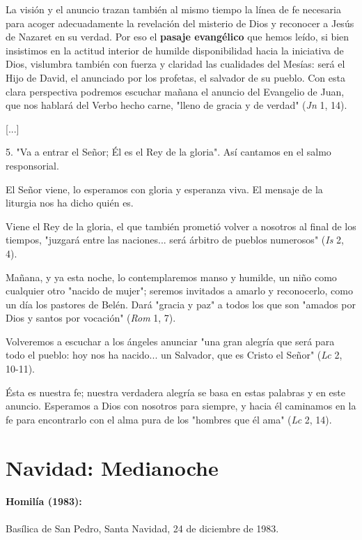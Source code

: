\begin{body}
\begin{body}
La visión y el anuncio trazan también al mismo tiempo la línea de fe necesaria para acoger adecuadamente la revelación del misterio de Dios y reconocer a Jesús de Nazaret en su verdad. Por eso el \textbf{pasaje evangélico} que hemos leído, si bien insistimos en la actitud interior de humilde disponibilidad hacia la iniciativa de Dios, vislumbra también con fuerza y ​​claridad las cualidades del Mesías: será el Hijo de David, el anunciado por los profetas, el salvador de su pueblo. Con esta clara perspectiva podremos escuchar mañana el anuncio del Evangelio de Juan, que nos hablará del Verbo hecho carne, "lleno de gracia y de verdad" (\emph{Jn} 1, 14).

{[}...{]}

5. "Va a entrar el Señor; Él es el Rey de la gloria". Así cantamos en el salmo responsorial.

El Señor viene, lo esperamos con gloria y esperanza viva. El mensaje de la liturgia nos ha dicho quién es.

Viene el Rey de la gloria, el que también prometió volver a nosotros al final de los tiempos, "juzgará entre las naciones... será árbitro de pueblos numerosos" (\emph{Is} 2, 4).

Mañana, y ya esta noche, lo contemplaremos manso y humilde, un niño como cualquier otro "nacido de mujer"; seremos invitados a amarlo y reconocerlo, como un día los pastores de Belén. Dará "gracia y paz" a todos los que son "amados por Dios y santos por vocación" (\emph{Rom} 1, 7).

Volveremos a escuchar a los ángeles anunciar "una gran alegría que será para todo el pueblo: hoy nos ha nacido... un Salvador, que es Cristo el Señor" (\emph{Lc} 2, 10-11).

Ésta es nuestra fe; nuestra verdadera alegría se basa en estas palabras y en este anuncio. Esperamos a Dios con nosotros para siempre, y hacia él caminamos en la fe para encontrarlo con el alma pura de los "hombres que él ama" (\emph{Lc} 2, 14).
\end{body} 

\chapter{Navidad: Medianoche}

\subsubsection{Homilía (1983): }

Basílica de San Pedro, Santa Navidad, 24 de diciembre de 1983.


\end{body}
